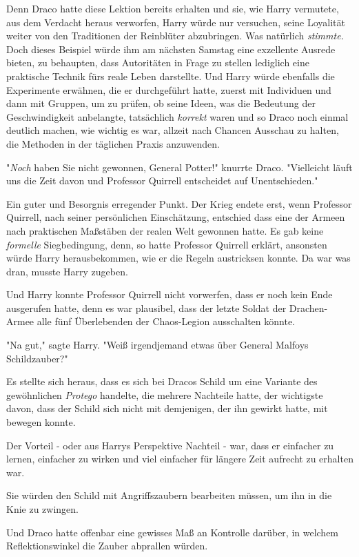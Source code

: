 {Denn Draco hatte diese Lektion bereits erhalten und sie, wie Harry vermutete, aus dem Verdacht heraus verworfen, Harry würde nur versuchen, seine Loyalität weiter von den Traditionen der Reinblüter abzubringen. Was natürlich \emph{stimmte.} Doch dieses Beispiel würde ihm am nächsten Samstag eine exzellente Ausrede bieten, zu behaupten, dass Autoritäten in Frage zu stellen lediglich eine praktische Technik fürs reale Leben darstellte. Und Harry würde ebenfalls die Experimente erwähnen, die er durchgeführt hatte, zuerst mit Individuen und dann mit Gruppen, um zu prüfen, ob seine Ideen, was die Bedeutung der Geschwindigkeit anbelangte, tatsächlich \emph{korrekt} waren und so Draco noch einmal deutlich machen, wie wichtig es war, allzeit nach Chancen Ausschau zu halten, die Methoden in der täglichen Praxis anzuwenden.

"\emph{Noch} haben Sie nicht gewonnen, General Potter!" knurrte Draco. "Vielleicht läuft uns die Zeit davon und Professor Quirrell entscheidet auf Unentschieden."

Ein guter und Besorgnis erregender Punkt. Der Krieg endete erst, wenn Professor Quirrell, nach seiner persönlichen Einschätzung, entschied dass eine der Armeen nach praktischen Maßstäben der realen Welt gewonnen hatte. Es gab keine \emph{formelle} Siegbedingung, denn, so hatte Professor Quirrell erklärt, ansonsten würde Harry herausbekommen, wie er die Regeln austricksen konnte. Da war was dran, musste Harry zugeben.

Und Harry konnte Professor Quirrell nicht vorwerfen, dass er noch kein Ende ausgerufen hatte, denn es war plausibel, dass der letzte Soldat der Drachen-Armee alle fünf Überlebenden der Chaos-Legion ausschalten könnte.

"Na gut," sagte Harry. "Weiß irgendjemand etwas über General Malfoys Schildzauber?"

Es stellte sich heraus, dass es sich bei Dracos Schild um eine Variante des gewöhnlichen \emph{Protego} handelte, die mehrere Nachteile hatte, der wichtigste davon, dass der Schild sich nicht mit demjenigen, der ihn gewirkt hatte, mit bewegen konnte.

Der Vorteil - oder aus Harrys Perspektive Nachteil - war, dass er einfacher zu lernen, einfacher zu wirken und viel einfacher für längere Zeit aufrecht zu erhalten war.

Sie würden den Schild mit Angriffszaubern bearbeiten müssen, um ihn in die Knie zu zwingen.

Und Draco hatte offenbar eine gewisses Maß an Kontrolle darüber, in welchem Reflektionswinkel die Zauber abprallen würden.

}
